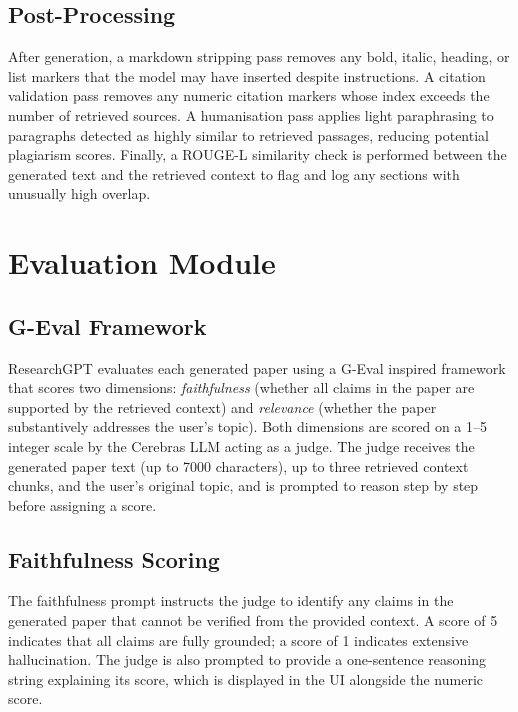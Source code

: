 \documentclass[12pt, a4paper]{article}
\begin{document}
\subsection{Post-Processing}

After generation, a markdown stripping pass removes any bold, italic, heading, or
list markers that the model may have inserted despite instructions. A citation
validation pass removes any numeric citation markers whose index exceeds the number
of retrieved sources. A humanisation pass applies light paraphrasing to paragraphs
detected as highly similar to retrieved passages, reducing potential plagiarism
scores. Finally, a ROUGE-L similarity check is performed between the generated text
and the retrieved context to flag and log any sections with unusually high overlap.

\section{Evaluation Module}

\subsection{G-Eval Framework}

ResearchGPT evaluates each generated paper using a G-Eval \cite{liu2023} inspired
framework that scores two dimensions: \textit{faithfulness} (whether all claims in
the paper are supported by the retrieved context) and \textit{relevance} (whether
the paper substantively addresses the user's topic). Both dimensions are scored on a
1--5 integer scale by the Cerebras LLM acting as a judge. The judge receives the
generated paper text (up to 7000 characters), up to three retrieved context chunks,
and the user's original topic, and is prompted to reason step by step before
assigning a score.

\subsection{Faithfulness Scoring}

The faithfulness prompt instructs the judge to identify any claims in the generated
paper that cannot be verified from the provided context. A score of 5 indicates
that all claims are fully grounded; a score of 1 indicates extensive hallucination.
The judge is also prompted to provide a one-sentence reasoning string explaining
its score, which is displayed in the UI alongside the numeric score.
\end{document}
